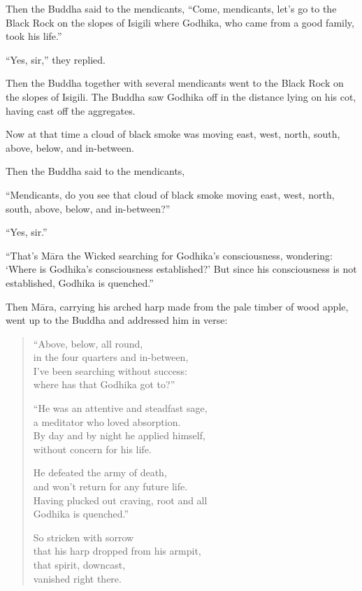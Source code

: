 \documentclass[12pt,openany]{book}%
\begin{document}
Then the Buddha said to the mendicants, “Come, mendicants, let’s go to the Black Rock on the slopes of Isigili where Godhika, who came from a good family, took his life.” 

“Yes, sir,” they replied. 

Then the Buddha together with several mendicants went to the Black Rock on the slopes of Isigili. The Buddha saw Godhika off in the distance lying on his cot, having cast off the aggregates. 

Now at that time a cloud of black smoke was moving east, west, north, south, above, below, and in-between. 

Then the Buddha said to the mendicants, 

“Mendicants, do you see that cloud of black smoke moving east, west, north, south, above, below, and in-between?” 

“Yes, sir.” 

“That’s \textsanskrit{Māra} the Wicked searching for Godhika’s consciousness, wondering: ‘Where is Godhika’s consciousness established?’ But since his consciousness is not established, Godhika is quenched.” 

Then \textsanskrit{Māra}, carrying his arched harp made from the pale timber of wood apple, went up to the Buddha and addressed him in verse: 

\begin{verse}%
“Above, below, all round, \\
in the four quarters and in-between, \\
I’ve been searching without success: \\
where has that Godhika got to?” 

“He was an attentive and steadfast sage, \\
a meditator who loved absorption. \\
By day and by night he applied himself, \\
without concern for his life. 

He defeated the army of death, \\
and won’t return for any future life. \\
Having plucked out craving, root and all \\
Godhika is quenched.” 

So stricken with sorrow \\
that his harp dropped from his armpit, \\
that spirit, downcast, \\
vanished right there. 

%
\end{verse}
\end{document}
